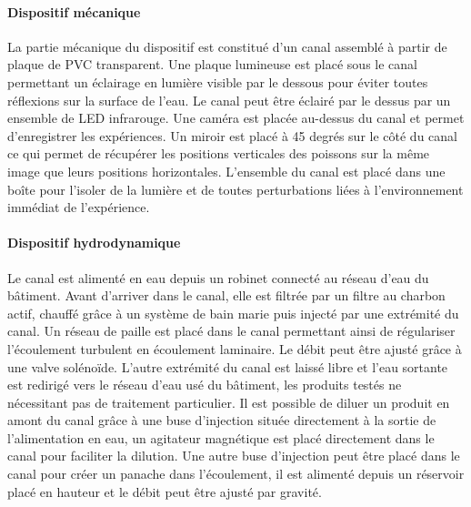   \paragraph{Dispositif mécanique}
  La partie mécanique du dispositif est constitué d'un canal assemblé à partir de plaque de PVC transparent. Une plaque lumineuse est placé sous le canal permettant un éclairage en lumière visible par le dessous pour éviter toutes réflexions sur la surface de l'eau. Le canal peut être éclairé par le dessus par un ensemble de LED infrarouge. Une caméra est placée au-dessus du canal et permet d'enregistrer les expériences. Un miroir est placé à 45 degrés sur le côté du canal ce qui permet de récupérer les positions verticales des poissons sur la même image que leurs positions horizontales. L'ensemble du canal est placé dans une boîte pour l'isoler de la lumière et de toutes perturbations liées à l'environnement immédiat de l'expérience.
  \paragraph{Dispositif hydrodynamique}
  Le canal est alimenté en eau depuis un robinet connecté au réseau d'eau du bâtiment. Avant d'arriver dans le canal, elle est filtrée par un filtre au charbon actif, chauffé grâce à un système de bain marie puis injecté par une extrémité du canal. Un réseau de paille est placé dans le canal permettant ainsi de régulariser l'écoulement turbulent en écoulement laminaire. Le débit peut être ajusté grâce à une valve solénoïde. L'autre extrémité du canal est laissé libre et l'eau sortante est redirigé vers le réseau d'eau usé du bâtiment, les produits testés ne nécessitant pas de traitement particulier. Il est possible de diluer un produit en amont du canal grâce à une buse d'injection située directement à la sortie de l'alimentation en eau, un agitateur magnétique est placé directement dans le canal pour faciliter la dilution. Une autre buse d'injection peut être placé dans le canal pour créer un panache dans l'écoulement, il est alimenté depuis un réservoir placé en hauteur et le débit peut être ajusté par gravité.
